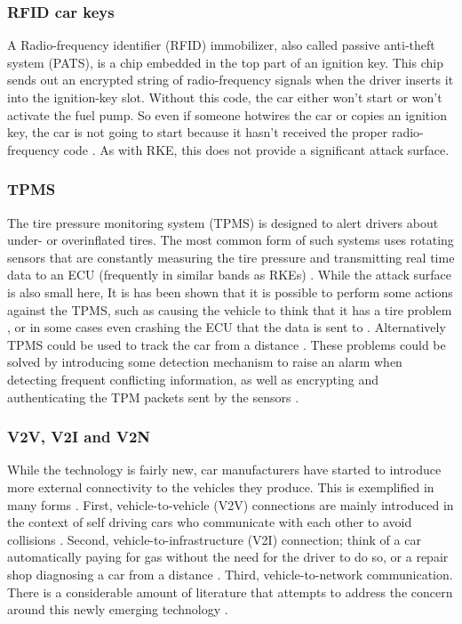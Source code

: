 \subsubsection{RFID car keys}
\label{subsubsec:rfid} 

A Radio-frequency identifier (RFID) immobilizer, also called passive anti-theft system (PATS), is a chip embedded in the top part of an ignition key. This chip sends out an encrypted string of radio-frequency signals when the driver inserts it into the ignition-key slot. Without this code, the car either won't start or won't activate the fuel pump. So even if someone hotwires the car or copies an ignition key, the car is not going to start because it hasn't received the proper radio-frequency code \cite{RFID}. As with RKE, this does not provide a significant attack surface. \cite{MillerA}

\subsubsection{TPMS} 
\label{subsubsec:tpms}

The tire pressure monitoring system (TPMS) is designed to alert drivers about under- or overinflated tires. The most common form of such systems uses rotating sensors that are constantly measuring the tire pressure and transmitting real time data to an ECU (frequently in similar bands as RKEs) \cite{Kosher}. While the attack surface is also small here, It is has been shown that it is possible to perform some actions against the TPMS, such as causing the vehicle to think that it has a tire problem \cite{TPMS}, or in some cases even crashing the ECU that the data is sent to \cite{MillerA}. Alternatively TPMS could be used to track the car from a distance \cite{TPMS}. These problems could be solved by introducing some detection mechanism to raise an alarm when detecting frequent conflicting information, as well as encrypting and authenticating the TPM packets sent by the sensors \cite{TPMS}.

\subsubsection{V2V, V2I and V2N} 
\label{subsubsec:v2v}

While the technology is fairly new, car manufacturers have started to introduce more external connectivity to the vehicles they produce. This is exemplified in many forms \cite{Ahmed}. First, vehicle-to-vehicle (V2V) connections are mainly introduced in the context of self driving cars who communicate with each other to avoid collisions \cite{Enisa}. Second, vehicle-to-infrastructure (V2I) connection; think of a car automatically paying for gas without the need for the driver to do so, or a repair shop diagnosing a car from a distance \cite{Kleberger}. Third, vehicle-to-network communication. There is a considerable amount of literature that attempts to address the concern around this newly emerging technology \cite{Kleberger15, Russel17, Maxim, Crispo}.

